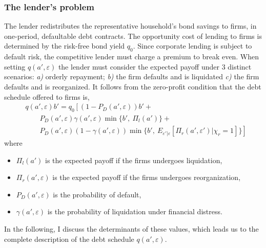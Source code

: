 \documentclass[12pt]{article}
\begin{document}
\subsubsection{The lender's problem}    \label{sec: The lender's problem}
The lender redistributes the representative household's bond savings to firms, in one-period, defaultable debt contracts. The opportunity cost of lending to firms is determined by the risk-free bond yield $q_0$. Since corporate lending is subject to default risk, the competitive lender must charge a premium to break even. When setting $q(a',\varepsilon)$ the lender must consider the expected payoff under 3 distinct scenarios: \textit{a)} orderly repayment; \textit{b)} the firm defaults and is liquidated \textit{c)} the firm defaults and is reorganized. It follows from the zero-profit condition that the debt schedule offered to firms is, 
\begin{equation} \label{eq:q}
    \begin{split}
        & q(a', \varepsilon)b' = q_0 \left[ \left(1-P_D(a', \varepsilon)\right)b' + \right. \\
        & \qquad P_D(a', \varepsilon) \gamma(a', \varepsilon) \min \{b', \ \Pi_{l}(a')\} + \\ 
        & \qquad \left. P_D(a', \varepsilon) (1-\gamma(a', \varepsilon))\min \{b', \ E_{\varepsilon' | \varepsilon} [ \Pi_{r}(a', \varepsilon') |\chi_r = 1 ] \} \right]
    \end{split}
\end{equation}
where 
\begin{itemize}\setlength\itemsep{0em} 
    \item $\Pi_{l}(a')$ is the expected payoff if the firms undergoes liquidation,
    \item $\Pi_{r}(a', \varepsilon)$ is the expected payoff if the firms undergoes reorganization,
    \item $P_D(a', \varepsilon)$ is the probability of default,
    \item $\gamma(a', \varepsilon)$ is the probability of liquidation under financial distress. 
\end{itemize} 
In the following, I discuss the determinants of these values, which leads us to the complete description of the debt schedule $q(a', \varepsilon)$.
\end{document}
